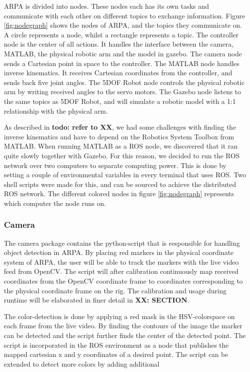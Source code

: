 \documentclass[11pt,a4paper]{report}
\begin{document}
	ARPA is divided into nodes. These nodes each has its own tasks and communicate with each other on different topics to exchange information. Figure \ref{fig:nodegraph} shows the nodes of ARPA, and the topics they communicate on. A circle represents a node, whilst a rectangle represents a topic. The controller node is the center of all actions. It handles the interface between the camera, MATLAB, the physical robotic arm and the model in gazebo. The camera node  sends a Cartesian point in space to the controller. The MATLAB node handles inverse kinematics. It receives Cartesian coordinates from the controller, and sends back five joint angles. The 5DOF Robot node controls the physical robotic arm by writing received angles to the servo motors. The Gazebo node listens to the same topics as 5DOF Robot, and will simulate a robotic model with a 1:1 relationship with the physical arm.
	
As described in \textbf{todo: refer to XX}, we had some challenges with finding the inverse kinematics and have to depend on the Robotics System Toolbox from MATLAB. When running MATLAB as a ROS node, we discovered that it ran quite slowly together with Gazebo. For this reason, we decided to run the ROS network over two computers to separate computing power. This is done by setting a couple of environmental variables in every terminal that uses ROS. Two shell scripts were made for this, and can be sourced to achieve the distributed ROS network. The different colored nodes in figure \ref{fig:nodegraph} represents which computer the node runs on.

\subsubsection{Camera}
The camera package contains the python-script that is responsible for handling object detection in ARPA. By placing red markers in the physical coordinate system of ARPA, the user will be able to track the markers with the live video feed from OpenCV. The script will after calibration continuously map received coordinates from the OpenCV coordinate frame to coordinates corresponding to the physical coordinate frame on the rig. The calibration and usage during runtime will be elaborated in finer detail in \textbf{XX: SECTION}.

The color-detection is done by applying a red mask in the HSV-colorspace on each frame from the live video. By finding the contours of the image the marker can be detected and the script further finds the center of the detected point. The script is incorporated in the ROS environment as a node that publishes the mapped cartesian x and y coordinates of a desired point. The script can be extended to detect more colors by adding additional
	
\end{document}

